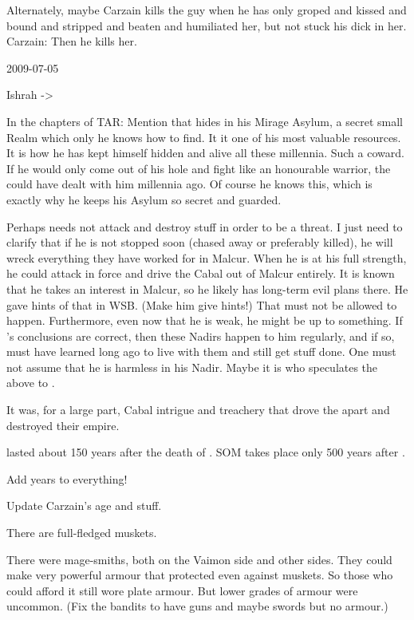 Alternately, maybe Carzain kills the guy when he has only groped and kissed and bound and stripped and beaten and humiliated her, but not stuck his dick in her.
Carzain: 
Then he kills her.



2009-07-05

Ishrah -> \ishrah

In the \resphan chapters of TAR:
Mention that \Ishnaruchaefir hides in his Mirage Asylum, a secret small Realm which only he knows how to find.
It it one of his most valuable resources.
It is how he has kept himself hidden and alive all these millennia.
Such a coward.
If he would only come out of his hole and fight like an honourable warrior, the \resphain could have dealt with him millennia ago. 
Of course he knows this, which is exactly why he keeps his Asylum so secret and guarded.

Perhaps \Ishnaruchaefir needs not attack and destroy stuff in order to be a threat. 
I just need to clarify that if he is not stopped soon (chased away or preferably killed), he will wreck everything they have worked for in Malcur.
When he is at his full strength, he could attack in force and drive the Cabal out of Malcur entirely.
It is known that he takes an interest in Malcur, so he likely has long-term evil plans there.
He gave hints of that in WSB. (Make him give hints!)
That must not be allowed to happen.
Furthermore, even now that he is weak, he might be up to something.
If \Urizeth's conclusions are correct, then these Nadirs happen to him regularly, and if so, \Ishnaruchaefir must have learned long ago to live with them and still get stuff done.
One must not assume that he is harmless in his Nadir.
Maybe it is \Azraid who speculates the above to \Teshrial.

It was, for a large part, Cabal intrigue and treachery that drove the \Ortaicans apart and destroyed their empire.

\Ortaica lasted about 150 years after the death of \Belzir.
SOM takes place only 500 years after \Belzir.

Add years to everything!

Update Carzain's age and stuff.

There are full-fledged muskets.

There were mage-smiths, both on the Vaimon side and other sides.
They could make very powerful armour that protected even against muskets.
So those who could afford it still wore plate armour.
But lower grades of armour were uncommon.
(Fix the bandits to have guns and maybe swords but no armour.)

